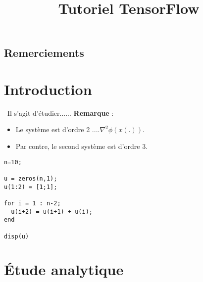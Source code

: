 \documentclass[a4paper,11pt]{book}
\theoremstyle{theo}
\begin{document}
\let\cleardoublepage\clearpage
\title{  Tutoriel TensorFlow}





\maketitle

\newpage
\section*{Remerciements}
\bigskip
\pagestyle{plain}
\bigskip
\newpage 
\tableofcontents
\newpage
\chapter{Introduction }
\
Il s'agit d'\'etudier......
\textbf{Remarque} : 
\begin{itemize}
\item Le système est d'ordre 2 ....$\nabla^2\phi(x(.))$. 
\item Par contre, le second système est d'ordre 3.
\end{itemize}
\par

\begin{lstlisting}
n=10;

u = zeros(n,1);
u(1:2) = [1;1];

for i = 1 : n-2;
  u(i+2) = u(i+1) + u(i);
end

disp(u)
\end{lstlisting}


\bigskip
\thispagestyle{empty}


\newpage


\newpage
\chapter{\'Etude analytique}
\pagestyle{fancy}
\fancyhf{}
\fancyhead[L]{\leftmark}
\fancyfoot[C]{\thepage}
\end{document}
